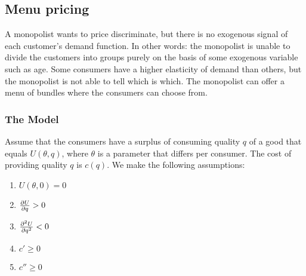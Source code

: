 \subsection{Menu pricing}
A monopolist wants to price discriminate, but there is no exogenous signal
of each customer's demand function. In other words: the monopolist is unable
to divide the customers into groups purely on the basis of some exogenous variable
such as age. Some consumers have a higher elasticity of demand than others, but the monopolist
is not able to tell which is which. The monopolist can offer a menu of bundles
where the consumers can choose from.
\subsubsection{The Model}
Assume that the consumers have a surplus of consuming quality $q$ of a good that
equals $U(\theta, q)$, where $\theta$ is a parameter that differs per consumer.
The cost of providing quality $q$  is $c(q)$. We make the following assumptions:
\begin{enumerate}
	\item $U(\theta,0)=0$
	\item $\frac{\partial U}{\partial q}>0$
	\item $\frac{\partial^2 U}{\partial q^2}<0$
	\item $c'\geq0$
	\item $c''\geq0$
\end{enumerate}
